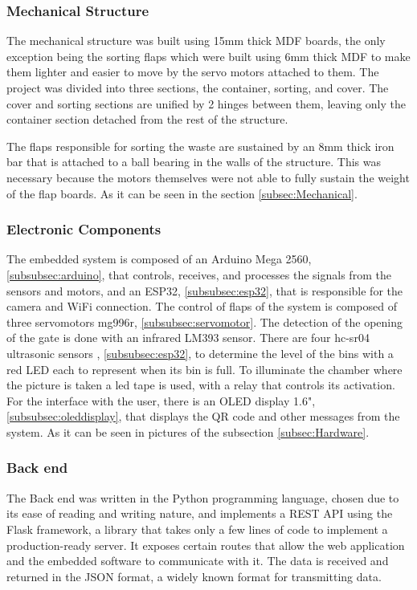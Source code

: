 \documentclass[a4paper,11pt]{article}
\begin{document}
\subsubsection{Mechanical Structure}
The mechanical structure was built using 15mm thick MDF boards, the only exception being the sorting flaps which were built using 6mm thick MDF to make them lighter and easier to move by the servo motors attached to them. The project was divided into three sections, the container, sorting, and cover. The cover and sorting sections are unified by 2 hinges between them, leaving only the container section detached from the rest of the structure.

The flaps responsible for sorting the waste are sustained by an 8mm thick iron bar that is attached to a ball bearing in the walls of the structure. This was necessary because the motors themselves were not able to fully sustain the weight of the flap boards. As it can be seen in the section \ref{subsec:Mechanical}.

\subsubsection{Electronic Components}
The embedded system is composed of an Arduino Mega 2560, \ref{subsubsec:arduino}, that controls, receives, and processes the signals from the sensors and motors, and an ESP32, \ref{subsubsec:esp32}, that is responsible for the camera and WiFi connection.
The control of flaps of the system is composed of three servomotors mg996r, \ref{subsubsec:servomotor}. The detection of the opening of the gate is done with an infrared LM393 sensor. There are four hc-sr04 ultrasonic sensors , \ref{subsubsec:esp32}, to determine the level of the bins with a red LED each to represent when its bin is full. To illuminate the chamber where the picture is taken a led tape is used, with a relay that controls its activation. For the interface with the user, there is an OLED display 1.6", \ref{subsubsec:oleddisplay}, that displays the QR code and other messages from the system. As it can be seen in pictures of the subsection \ref{subsec:Hardware}.

\subsubsection{Back end}
The Back end was written in the Python\cite{python}  programming language, chosen due to its ease of reading and writing nature, and implements a REST API using the Flask\cite{flask} framework, a library that takes only a few lines of code to implement a production-ready server. It exposes certain routes that allow the web application and the embedded software to communicate with it. The data is received and returned in the JSON format, a widely known format for transmitting data.
\end{document}
